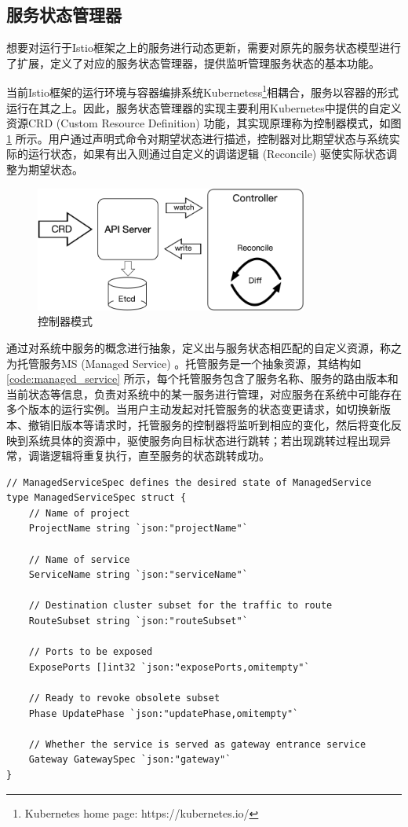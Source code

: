 \documentclass[macfonts,master]{njuthesis}
\begin{document}
\subsection{服务状态管理器}
想要对运行于Istio框架之上的服务进行动态更新，需要对原先的服务状态模型进行了扩展，定义了对应的服务状态管理器，提供监听管理服务状态的基本功能。

当前Istio框架的运行环境与容器编排系统Kubernetess\footnote{Kubernetes home page: https://kubernetes.io/}相耦合，服务以容器的形式运行在其之上。因此，服务状态管理器的实现主要利用Kubernetes中提供的自定义资源CRD (Custom Resource Definition) 功能，其实现原理称为控制器模式，如图\ref{fig:reconcile_loop} 所示。用户通过声明式命令对期望状态进行描述，控制器对比期望状态与系统实际的运行状态，如果有出入则通过自定义的调谐逻辑 (Reconcile) 驱使实际状态调整为期望状态。

\begin{figure}[!htbp]
  \centering
  \includegraphics[width= 0.8\textwidth]{image/reconcile_loop.png}
  \caption{控制器模式}
  \label{fig:reconcile_loop}
\end{figure}

通过对系统中服务的概念进行抽象，定义出与服务状态相匹配的自定义资源，称之为托管服务MS (Managed Service) 。托管服务是一个抽象资源，其结构如\ref{code:managed_service} 所示，每个托管服务包含了服务名称、服务的路由版本和当前状态等信息，负责对系统中的某一服务进行管理，对应服务在系统中可能存在多个版本的运行实例。当用户主动发起对托管服务的状态变更请求，如切换新版本、撤销旧版本等请求时，托管服务的控制器将监听到相应的变化，然后将变化反映到系统具体的资源中，驱使服务向目标状态进行跳转；若出现跳转过程出现异常，调谐逻辑将重复执行，直至服务的状态跳转成功。

\begin{lstlisting}[caption={托管服务结构}, label={code:managed_service}, style=golangStyle]
// ManagedServiceSpec defines the desired state of ManagedService
type ManagedServiceSpec struct {
	// Name of project
	ProjectName string `json:"projectName"`

	// Name of service
	ServiceName string `json:"serviceName"`

	// Destination cluster subset for the traffic to route
	RouteSubset string `json:"routeSubset"`

	// Ports to be exposed
	ExposePorts []int32 `json:"exposePorts,omitempty"`

	// Ready to revoke obsolete subset
	Phase UpdatePhase `json:"updatePhase,omitempty"`

	// Whether the service is served as gateway entrance service
	Gateway GatewaySpec `json:"gateway"`
}
\end{lstlisting}
\end{document}
